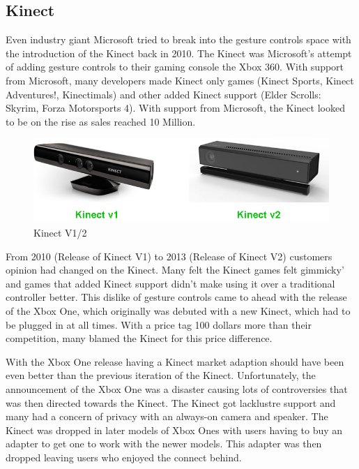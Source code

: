 \subsection{Kinect}
Even industry giant Microsoft tried to break into the gesture controls space with the introduction of the Kinect back in 2010. \cite{kinect} The Kinect was Microsoft's attempt of adding gesture controls to their gaming console the Xbox 360. With support from Microsoft, many developers made Kinect only games (Kinect Sports, Kinect Adventures!, Kinectimals) and other added Kinect support (Elder Scrolls: Skyrim, Forza Motorsports 4). With support from Microsoft, the Kinect looked to be on the rise as sales reached 10 Million. \cite{kinectsales}

\begin{figure}[H]
  \includegraphics[width=\linewidth]{img/Kinect.png}
  \caption{Kinect V1/2}
  \label{fig:KINECT}
\end{figure}

From 2010 (Release of Kinect V1) to 2013 (Release of Kinect V2) customers opinion had changed on the Kinect. Many felt the Kinect games felt gimmicky' and games that added Kinect support didn't make using it over a traditional controller better. This dislike of gesture controls came to ahead with the release of the Xbox One, which originally was debuted with a new Kinect, which had to be plugged in at all times. With a price tag 100 dollars more than their competition, many blamed the Kinect for this price difference. 

With the Xbox One release having a Kinect market adaption should have been even better than the previous iteration of the Kinect. Unfortunately, the announcement of the Xbox One was a disaster causing lots of controversies that was then directed towards the Kinect. The Kinect got lacklustre support and many had a concern of privacy with an always-on camera and speaker. The Kinect was dropped in later models of Xbox Ones with users having to buy an adapter to get one to work with the newer models. This adapter was then dropped leaving users who enjoyed the connect behind.

